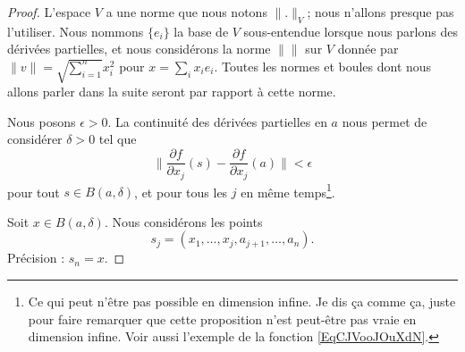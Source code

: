 \begin{proof}
	L'espace \( V\) a une norme que nous notons \( \| . \|_V\); nous n'allons presque pas l'utiliser. Nous nommons \( \{ e_i \}\) la base de \( V\) sous-entendue lorsque nous parlons des dérivées partielles, et nous considérons la norme \( \|  \|\) sur \( V\) donnée par \( \| v \|=\sqrt{ \sum_{i=1}^n }x_i^2\) pour \( x=\sum_ix_ie_i\). Toutes les normes et boules dont nous allons parler dans la suite seront par rapport à cette norme.

	Nous posons \( \epsilon>0\). La continuité des dérivées partielles en \( a\) nous permet de considérer \( \delta>0\) tel que
	\begin{equation}        \label{EQooPBYDooAtPkGl}
		\| \frac{ \partial f }{ \partial x_j }(s)-\frac{ \partial f }{ \partial x_j }(a) \|<\epsilon
	\end{equation}
	pour tout \( s\in  B(a,\delta)\), et pour tous les \( j\) en même temps\footnote{Ce qui peut n'être pas possible en dimension infine. Je dis ça comme ça, juste pour faire remarquer que cette proposition n'est peut-être pas vraie en dimension infine. Voir aussi l'exemple de la fonction \eqref{EqCJVooJOuXdN}.}.

	Soit \( x\in B(a,\delta)\). Nous considérons les points
	\begin{equation}
		s_j=(x_1,\ldots, x_j,a_{j+1},\ldots, a_n).
	\end{equation}
	Précision : \( s_n=x\).


\end{proof}
